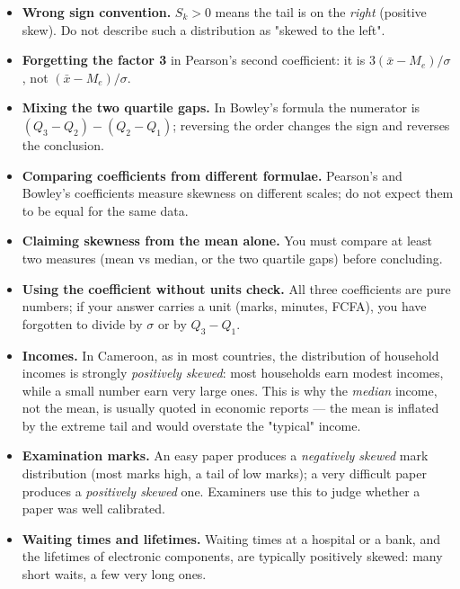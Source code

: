 \documentclass[11pt]{article}
\newcounter{popsec}
\newcounter{popsub}
\newcommand{\courssub}[1]{%
  \stepcounter{popsub}%
  \par\vspace{9pt}\noindent{\popxbold\fontsize{11.5}{13}\selectfont\color{popink}{\color{poporange}\thepopsec.\thepopsub}\hspace{6pt}#1}\par\nopagebreak\vspace{4pt}
}
\begin{document}
\begin{attention}
\begin{itemize}
\item \textbf{Wrong sign convention.} $S_k > 0$ means the tail is on the \emph{right} (positive skew). Do not describe such a distribution as "skewed to the left".
\item \textbf{Forgetting the factor 3} in Pearson's second coefficient: it is $3(\bar{x} - M_e)/\sigma$, not $(\bar{x} - M_e)/\sigma$.
\item \textbf{Mixing the two quartile gaps.} In Bowley's formula the numerator is $(Q_3 - Q_2) - (Q_2 - Q_1)$; reversing the order changes the sign and reverses the conclusion.
\item \textbf{Comparing coefficients from different formulae.} Pearson's and Bowley's coefficients measure skewness on different scales; do not expect them to be equal for the same data.
\item \textbf{Claiming skewness from the mean alone.} You must compare at least two measures (mean vs median, or the two quartile gaps) before concluding.
\item \textbf{Using the coefficient without units check.} All three coefficients are pure numbers; if your answer carries a unit (marks, minutes, FCFA), you have forgotten to divide by $\sigma$ or by $Q_3 - Q_1$.
\end{itemize}
\end{attention}

\courssub{Skewness in Real Life}

\begin{savaistu}
\begin{itemize}
\item \textbf{Incomes.} In Cameroon, as in most countries, the distribution of household incomes is strongly \emph{positively skewed}: most households earn modest incomes, while a small number earn very large ones. This is why the \emph{median} income, not the mean, is usually quoted in economic reports — the mean is inflated by the extreme tail and would overstate the "typical" income.
\item \textbf{Examination marks.} An easy paper produces a \emph{negatively skewed} mark distribution (most marks high, a tail of low marks); a very difficult paper produces a \emph{positively skewed} one. Examiners use this to judge whether a paper was well calibrated.
\item \textbf{Waiting times and lifetimes.} Waiting times at a hospital or a bank, and the lifetimes of electronic components, are typically positively skewed: many short waits, a few very long ones.
\end{itemize}
\end{savaistu}
\end{document}
